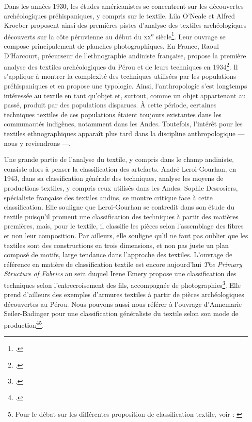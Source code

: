 \documentclass[a4paper, twoside, 12pt]{book}
\newcommand{\siecle}[1]{\textsc{#1}\textsuperscript{e} siècle}
\begin{document}
Dans les années 1930, les études américanistes se concentrent sur les découvertes archéologiques préhispaniques, y compris sur le textile. 
Lila O'Neale et Alfred Kroeber proposent ainsi des premières pistes d'analyse des textiles archéologiques découverts sur la côte péruvienne au début du \siecle{xx}\footcite{onealeTextilePeriodsAncient1930}. Leur ouvrage se compose principalement de planches photographiques.
En France, Raoul D'Harcourt, précurseur de l'ethnographie andiniste française, propose la première analyse des textiles archéologiques du Pérou et de leurs techniques en 1934\footcite{harcourtTextilesAnciensPerou2008}. Il s'applique à montrer la complexité des techniques utilisées par les populations préhispaniques et en propose une typologie. 
Ainsi, l'anthropologie s'est longtemps intéressée au textile en tant qu'objet et, surtout, comme un objet appartenant au passé, produit par des populations disparues. À cette période, certaines techniques textiles de ces populations étaient toujours existantes dans les communautés indigènes, notamment dans les Andes. Toutefois, l'intérêt pour les textiles ethnographiques apparaît plus tard dans la discipline anthropologique --- nous y reviendrons ---.

Une grande partie de l'analyse du textile, y compris dans le champ andiniste, consiste alors à penser la classification des artefacts. André Leroi-Gourhan, en 1943, dans sa classification générale des techniques, analyse les moyens de productions textiles, y compris ceux utilisés dans les Andes.
Sophie Desrosiers, spécialiste française des textiles andins, se montre critique face à cette classification. Elle souligne que Leroi-Gourhan se contredit dans son étude du textile puisqu'il promeut une classification des techniques à partir des matières premières, mais, pour le textile, il classifie les pièces selon l'assemblage des fibres et non leur composition. Par ailleurs, elle souligne qu'il ne faut pas oublier que les textiles sont des constructions en trois dimensions, et non pas juste un plan composé de motifs, large tendance dans l'approche des textiles. L'ouvrage de référence en matière de classification textile est encore aujourd'hui \textit{The Primary Structure of Fabrics} au sein duquel Irene Emery propose une classification des techniques selon l'entrecroisement des fils, accompagnée de photographies\footcite{emeryPrimaryStructuresFabrics1995}. Elle prend d'ailleurs des exemples d'armures textiles à partir de pièces archéologiques découvertes au Pérou. Nous pouvons aussi nous référer à l'ouvrage d'Annemarie Seiler-Badinger pour une classification généraliste du textile selon son mode de production\footcite{seiler-baldingerTextilesClassificationTechniques1995}\footnote{Pour le débat sur les différentes proposition de classification textile, voir : \cite{balfetOuSontClassifications1988}}.
\end{document}
